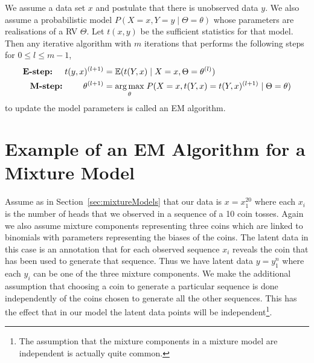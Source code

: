 \documentclass[a4paper,11pt,leqno]{report}\usepackage[]{graphicx}\usepackage[]{color}
\newcommand{\E}{\mathbb{E}}
\begin{document}
\begin{Definition}[EM algorithm]\label{def:EM}
We assume a data set $ x $ and postulate that there is unobserved data $ y $. We also
assume a probabilistic model $ P(X=x,Y=y \mid \Theta = \theta) $ whose parameters are realisations of a RV
$ \Theta $. Let $ t(x,y) $ be the sufficient statistics for that model. Then any
iterative algorithm with $ m $ iterations that performs the following
steps for $0\leq l \leq m-1$, 
\begin{align*}
\mbox{\textbf{E-step:} } \quad t(y,x)^{(l+1)} &= \E(t(Y,x) \mid X = x, \Theta = \theta^{(l)}) \\
\mbox{\textbf{M-step:} } \qquad \theta^{(l+1)} &= \underset{\theta}{\arg\max} \; P(X=x, t(Y,x) = t(Y,x)^{(l+1)} \mid \Theta = \theta) 
\end{align*}
to update the model parameters is called an EM algorithm. 
\end{Definition}

\section{Example of an EM Algorithm for a Mixture Model}

Assume as in Section~\ref{sec:mixtureModels} that our data is $ x=x^{20}_{1} $ where each $ x_{i} $ is the 
number of heads that we observed in a sequence of a 10 coin tosses. Again we also assume mixture components representing three coins which are linked
to binomials with parameters representing the biases of the coins. 
The latent data in this case is an annotation that for each observed sequence $ x_{i} $ reveals the coin that has been used
to generate that sequence. Thus we have latent data $ y=y_{1}^{n} $ where each $ y_{i} $ can be one of the three mixture components. 
We make the additional assumption that choosing a coin to generate a particular sequence is done independently of the coins chosen
to generate all the other sequences. This has the effect that in our model the latent data points will be independent\footnote{The assumption
that the mixture components in a mixture model are independent is actually quite common.}.
\end{document}
